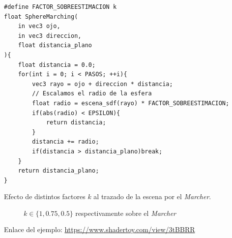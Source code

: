 \begin{lstlisting}
#define FACTOR_SOBREESTIMACION k
float SphereMarching(
    in vec3 ojo,
    in vec3 direccion, 
    float distancia_plano
){
    float distancia = 0.0;
    for(int i = 0; i < PASOS; ++i){
        vec3 rayo = ojo + direccion * distancia;
        // Escalamos el radio de la esfera
        float radio = escena_sdf(rayo) * FACTOR_SOBREESTIMACION;
        if(abs(radio) < EPSILON){
            return distancia;
        }
        distancia += radio;
        if(distancia > distancia_plano)break;
    }
    return distancia_plano;
}
\end{lstlisting}
Efecto de distintos factores \(k\) al trazado de la escena por el \textit{Marcher}.

\begin{figure}[H]
  \centering
  \captionsetup{justification=centering}%
  \hfill
  \hfill
  \caption{\(k\in\{1, 0.75, 0.5\}\) respectivamente sobre el \textit{Marcher}}
\end{figure}

Enlace del ejemplo:
\url{https://www.shadertoy.com/view/3tBBRR}


